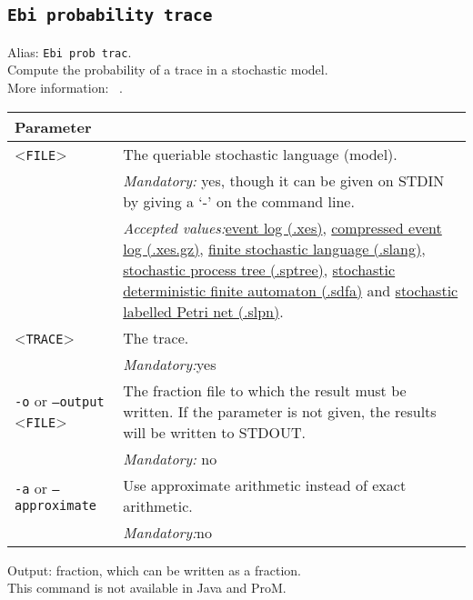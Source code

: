 {\subsection{\texttt{Ebi probability trace}}
\label{command:Ebi probability trace}
Alias: \texttt{Ebi prob trac}.\\
Compute the probability of a trace in a stochastic model.\\
More information: ~\cite{DBLP:journals/is/LeemansMM24}.\\
\begin{tabularx}{\linewidth}{lX}
\toprule
Parameter \\\midrule
<\texttt{FILE}>&The queriable stochastic language (model).\\
&\textit{Mandatory:} \quad yes, though it can be given on STDIN by giving a `-' on the command line.\\
&\textit{Accepted values:}\quad \hyperref[filehandler:event log]{event log (.xes)}, \hyperref[filehandler:compressed event log]{compressed event log (.xes.gz)}, \hyperref[filehandler:finite stochastic language]{finite stochastic language (.slang)}, \hyperref[filehandler:stochastic process tree]{stochastic process tree (.sptree)}, \hyperref[filehandler:stochastic deterministic finite automaton]{stochastic deterministic finite automaton (.sdfa)} and \hyperref[filehandler:stochastic labelled Petri net]{stochastic labelled Petri net (.slpn)}.\\
<\texttt{TRACE}>
&The trace.\\
&\textit{Mandatory:}\quad yes\\
\texttt{-o} or \texttt{--output} <\texttt{FILE}> &
The fraction file to which the result must be written. If the parameter is not given, the results will be written to STDOUT.\\
&\textit{Mandatory:} \quad no\\
\texttt{-a} or \texttt{--approximate} & Use approximate arithmetic instead of exact arithmetic.\\
&\textit{Mandatory:}\quad no\\
\bottomrule
\end{tabularx}
\noindent Output: fraction, which can be written as a fraction.
\\This command is not available in Java and ProM.
}
